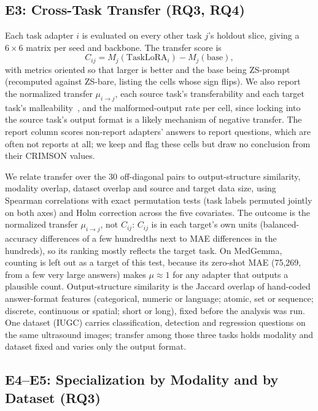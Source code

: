 \documentclass[journal,twoside,web]{ieeecolor}
\begin{document}
\subsection{E3: Cross-Task Transfer (RQ3, RQ4)}
\label{sec:e3}

Each task adapter $i$ is evaluated on every other task $j$'s holdout slice,
giving a $6\times6$ matrix per seed and backbone. The transfer score is
\begin{equation}
C_{ij}=M_j(\mathrm{TaskLoRA}_i)-M_j(\mathrm{base}),
\end{equation}
with metrics oriented so that larger is better and the base being
ZS-prompt (recomputed against ZS-bare, listing the cells whose sign flips).
We also report the normalized transfer $\mu_{i\to j}$, each source task's
transferability and each target task's malleability~\cite{sachdeva2026tasktransfer},
and the malformed-output rate per cell, since locking into the source task's
output format is a likely mechanism of negative transfer.
The report column scores non-report adapters' answers to report questions,
which are often not reports at all; we keep and flag these cells but draw no
conclusion from their CRIMSON values.

We relate transfer over the 30 off-diagonal pairs to output-structure
similarity, modality overlap, dataset overlap and source and target data
size, using Spearman correlations with exact permutation tests (task labels
permuted jointly on both axes) and Holm correction across the five
covariates. The outcome is the normalized transfer $\mu_{i\to j}$, not
$C_{ij}$: $C_{ij}$ is in each target's own units (balanced-accuracy
differences of a few hundredths next to MAE differences in the hundreds), so
its ranking mostly reflects the target task. On MedGemma, counting is left
out as a target of this test, because its zero-shot MAE (75{,}269, from a few
very large answers) makes $\mu\approx1$ for any adapter that outputs a
plausible count. Output-structure similarity is the Jaccard overlap of
hand-coded answer-format features (categorical, numeric or language; atomic,
set or sequence; discrete, continuous or spatial; short or long), fixed
before the analysis was run. One dataset (IUGC)
carries classification, detection and regression questions on the same
ultrasound images; transfer among those three tasks holds modality and
dataset fixed and varies only the output format.

\subsection{E4--E5: Specialization by Modality and by Dataset (RQ3)}
\label{sec:e4}
\end{document}
